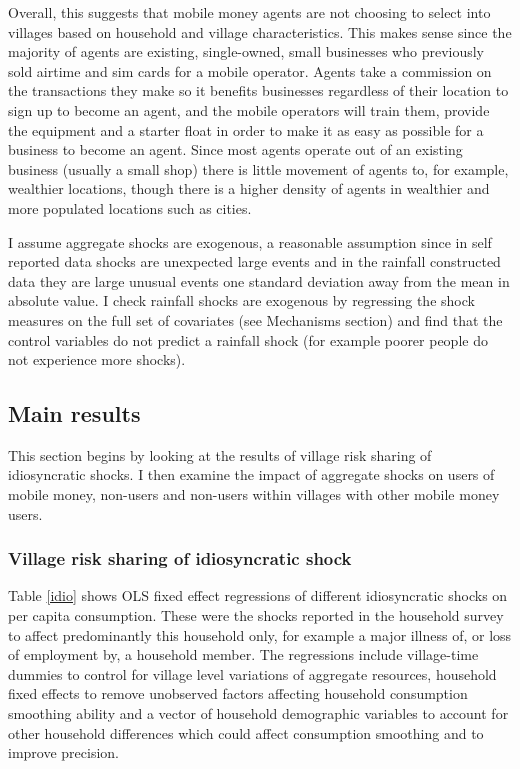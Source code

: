 Overall, this suggests that mobile money agents are not choosing to select into villages based on household and village characteristics. This makes sense since the majority of agents are existing, single-owned, small businesses who previously sold airtime and sim cards for a mobile operator. Agents take a commission on the transactions they make so it benefits businesses regardless of their location to sign up to become an agent, and the mobile operators will train them, provide the equipment and a starter float in order to make it as easy as possible for a business to become an agent. Since most agents operate out of an existing business (usually a small shop) there is little movement of agents to, for example, wealthier locations, though there is a higher density of agents in wealthier and more populated locations such as cities. 


I assume aggregate shocks are exogenous, a reasonable assumption since in self reported data shocks are unexpected large events and in the rainfall constructed data they are large unusual events one standard deviation away from the mean in absolute value. I check rainfall shocks are exogenous by regressing the shock measures on the full set of covariates (see Mechanisms section) and find that the control variables do not predict a rainfall shock (for example poorer people do not experience more shocks).  

\subsection{Main results}
This section begins by looking at the results of village risk sharing of idiosyncratic shocks. I then examine the impact of aggregate shocks on users of mobile money, non-users and non-users within villages with other mobile money users.  

\subsubsection{Village risk sharing of idiosyncratic shock}
Table \ref{idio} shows OLS fixed effect regressions of different idiosyncratic shocks on per capita consumption. These were the shocks reported in the household survey to affect predominantly this household only, for example a major illness of, or loss of employment by, a household member. The regressions include village-time dummies to control for village level variations of aggregate resources, household fixed effects to remove unobserved factors affecting household consumption smoothing ability and a vector of household demographic variables to account for other household differences which could affect consumption smoothing and to improve precision. 

